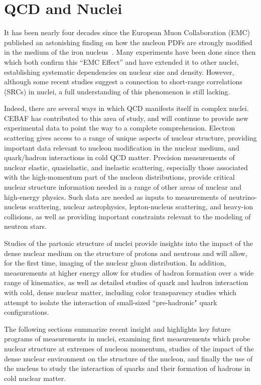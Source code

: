 \section{QCD and Nuclei}

It has been nearly four decades since the European Muon Collaboration (EMC) published an astonishing finding on how the nucleon PDFs are strongly modified in the medium of the iron nucleus~\cite{EuropeanMuon:1983wih}. Many experiments have been done since then which both confirm this ``EMC Effect'' and have extended it to other nuclei, establishing systematic dependencies on nuclear size and density. However, although some recent studies suggest a connection to short-range correlations (SRCs) in nuclei, a full understanding of this phenomenon is still lacking.

Indeed, there are several ways in which QCD manifests itself in complex nuclei. CEBAF has contributed to this area of study, and will continue to provide new experimental data to point the way to a complete comprehension. Electron scattering gives access to a range of unique aspects of nuclear structure, providing important data relevant to nucleon modification in the nuclear medium, and quark/hadron interactions in cold QCD matter. Precision measurements of nuclear elastic, quasielastic, and inelastic scattering, especially those associated with the high-momentum part of the nucleon distributions, provide critical nuclear structure information needed in a range of other areas of nuclear and high-energy physics. Such data are needed as inputs to measurements of neutrino-nucleus scattering, nuclear astrophysics, lepton-nucleus scattering, and heavy-ion collisions, as well as providing important constraints relevant to the modeling of neutron stars. 

Studies of the partonic structure of nuclei provide insights into the impact of the dense nuclear medium on the structure of protons and neutrons and will allow, for the first time, imaging of the nuclear gluon distribution. In addition, measurements at higher energy allow for studies of hadron formation over a wide range of kinematics, as well as detailed studies of quark and hadron interaction with cold, dense nuclear matter, including color transparency studies which attempt to isolate the interaction of small-sized ``pre-hadronic" quark configurations.

The following sections summarize recent insight and highlights key future programs of measurements in nuclei, examining first measurements which probe nuclear structure at extremes of nucleon momentum, studies of the impact of the dense nuclear environment on the structure of the nucleon, and finally the use of the nucleus to study the interaction of quarks and their formation of hadrons in cold nuclear matter.



